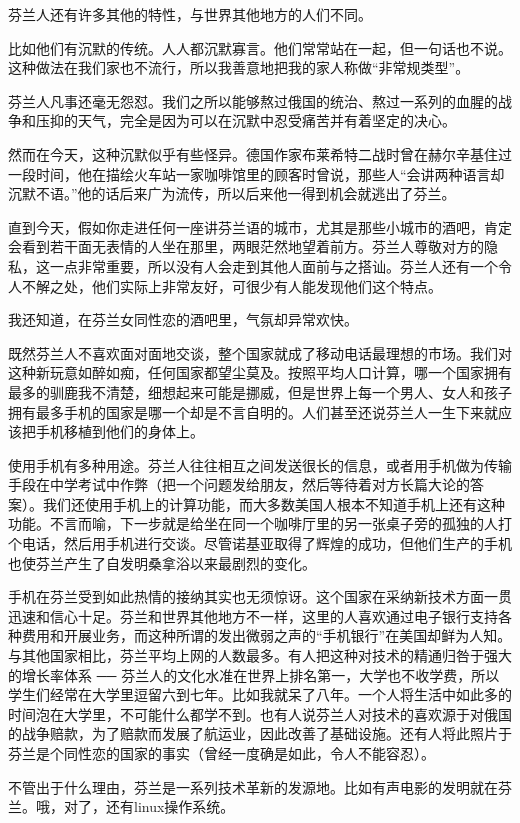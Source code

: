 芬兰人还有许多其他的特性，与世界其他地方的人们不同。

比如他们有沉默的传统。人人都沉默寡言。他们常常站在一起，但一句话也不说。这种做法在我们家也不流行，所以我善意地把我的家人称做“非常规类型”。

芬兰人凡事还毫无怨怼。我们之所以能够熬过俄国的统治、熬过一系列的血腥的战争和压抑的天气，完全是因为可以在沉默中忍受痛苦并有着坚定的决心。

然而在今天，这种沉默似乎有些怪异。德国作家布莱希特二战时曾在赫尔辛基住过一段时间，他在描绘火车站一家咖啡馆里的顾客时曾说，那些人“会讲两种语言却沉默不语。”他的话后来广为流传，所以后来他一得到机会就逃出了芬兰。

直到今天，假如你走进任何一座讲芬兰语的城市，尤其是那些小城市的酒吧，肯定会看到若干面无表情的人坐在那里，两眼茫然地望着前方。芬兰人尊敬对方的隐私，这一点非常重要，所以没有人会走到其他人面前与之搭讪。芬兰人还有一个令人不解之处，他们实际上非常友好，可很少有人能发现他们这个特点。

我还知道，在芬兰女同性恋的酒吧里，气氛却异常欢快。

既然芬兰人不喜欢面对面地交谈，整个国家就成了移动电话最理想的市场。我们对这种新玩意如醉如痴，任何国家都望尘莫及。按照平均人口计算，哪一个国家拥有最多的驯鹿我不清楚，细想起来可能是挪威，但是世界上每一个男人、女人和孩子拥有最多手机的国家是哪一个却是不言自明的。人们甚至还说芬兰人一生下来就应该把手机移植到他们的身体上。

使用手机有多种用途。芬兰人往往相互之间发送很长的信息，或者用手机做为传输手段在中学考试中作弊（把一个问题发给朋友，然后等待着对方长篇大论的答案）。我们还使用手机上的计算功能，而大多数美国人根本不知道手机上还有这种功能。不言而喻，下一步就是给坐在同一个咖啡厅里的另一张桌子旁的孤独的人打个电话，然后用手机进行交谈。尽管诺基亚取得了辉煌的成功，但他们生产的手机也使芬兰产生了自发明桑拿浴以来最剧烈的变化。

手机在芬兰受到如此热情的接纳其实也无须惊讶。这个国家在采纳新技术方面一贯迅速和信心十足。芬兰和世界其他地方不一样，这里的人喜欢通过电子银行支持各种费用和开展业务，而这种所谓的发出微弱之声的“手机银行”在美国却鲜为人知。与其他国家相比，芬兰平均上网的人数最多。有人把这种对技术的精通归咎于强大的增长率体系 ── 芬兰人的文化水准在世界上排名第一，大学也不收学费，所以学生们经常在大学里逗留六到七年。比如我就呆了八年。一个人将生活中如此多的时间泡在大学里，不可能什么都学不到。也有人说芬兰人对技术的喜欢源于对俄国的战争赔款，为了赔款而发展了航运业，因此改善了基础设施。还有人将此照片于芬兰是个同性恋的国家的事实（曾经一度确是如此，令人不能容忍）。

不管出于什么理由，芬兰是一系列技术革新的发源地。比如有声电影的发明就在芬兰。哦，对了，还有linux操作系统。

